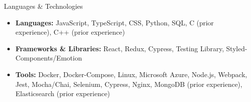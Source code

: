 \documentclass[]{mcdowellcv}
\begin{document}
	\begin{cvsection}{Languages \& Technologies}
		\begin{cvsubsection}{}{}{}
			\begin{itemize}
				\item \textbf{Languages:} JavaScript, TypeScript, CSS, Python, SQL, C (prior experience), C++ (prior experience)
				\item \textbf{Frameworks \& Libraries:} React, Redux, Cypress, Testing Library, Styled-Components/Emotion
				\item \textbf{Tools:} Docker, Docker-Compose, Linux, Microsoft Azure, Node.js, Webpack, Jest, Mocha/Chai, Selenium, Cypress, Nginx, MongoDB (prior experience), Elasticsearch (prior experience)
			\end{itemize}
		\end{cvsubsection}
	\end{cvsection}
\end{document}
